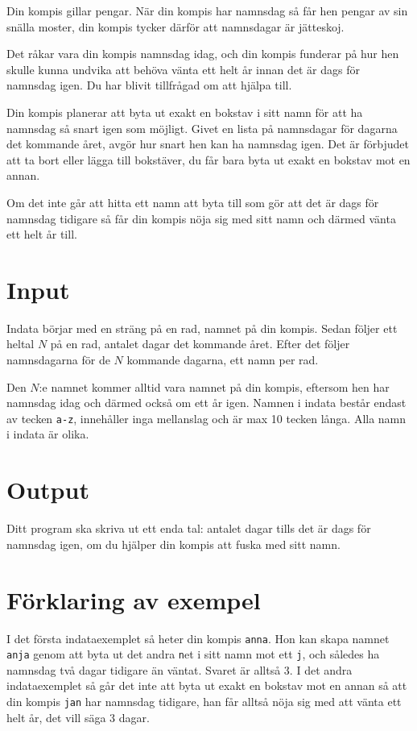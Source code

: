
Din kompis gillar pengar. När din kompis har namnsdag så får hen pengar av sin snälla moster,
din kompis tycker därför att namnsdagar är jätteskoj.

Det råkar vara din kompis namnsdag idag, och din kompis funderar på hur hen skulle kunna
undvika att behöva vänta ett helt år innan det är dags för namnsdag igen. Du har blivit tillfrågad
om att hjälpa till.

Din kompis planerar att byta ut exakt en bokstav i sitt namn för att ha namnsdag så
snart igen som möjligt. Givet en lista på namnsdagar för dagarna det kommande
året, avgör hur snart hen kan ha namnsdag igen. Det är förbjudet att ta bort eller
lägga till bokstäver, du får bara byta ut exakt en bokstav mot en annan.

Om det inte går att hitta ett namn att byta till som gör att det är dags för
namnsdag tidigare så får din kompis nöja sig med sitt namn och därmed vänta ett
helt år till.

\section*{Input}
Indata börjar med en sträng på en rad, namnet på din kompis.
Sedan följer ett heltal $N$ på en rad, antalet dagar det kommande året.
Efter det följer namnsdagarna för de $N$ kommande dagarna, ett namn per rad.

Den $N$:e namnet kommer alltid vara namnet på din kompis,
eftersom hen har namnsdag idag och därmed också om ett år igen. Namnen i indata
består endast av tecken \texttt{a-z}, innehåller inga mellanslag och är max 10 tecken långa. Alla namn i indata är olika.


\section*{Output}
Ditt program ska skriva ut ett enda tal: antalet dagar tills det är dags för
namnsdag igen, om du hjälper din kompis att fuska med sitt namn. 

\section*{Förklaring av exempel}
I det första indataexemplet så heter din kompis \texttt{anna}. Hon kan skapa namnet
\texttt{anja} genom att byta ut det andra \texttt{n}et i sitt namn mot ett \texttt{j},
 och således ha namnsdag två dagar tidigare än väntat. Svaret är alltså 3.
I det andra indataexemplet så går det inte att byta ut exakt en bokstav mot en annan
så att din kompis \texttt{jan} har namnsdag tidigare, han får alltså nöja sig med att
vänta ett helt år, det vill säga 3 dagar.

